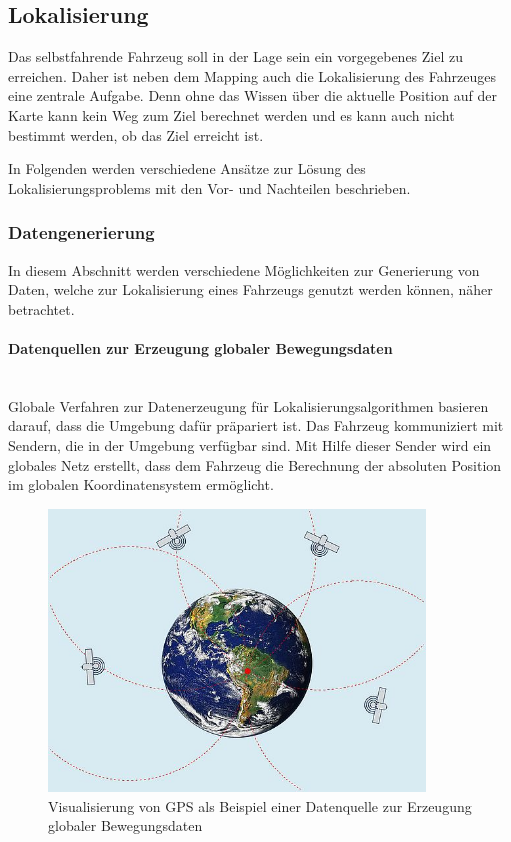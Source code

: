 \subsection{Lokalisierung}
Das selbstfahrende Fahrzeug soll in der Lage sein ein vorgegebenes Ziel zu erreichen. 
Daher ist neben dem Mapping auch die Lokalisierung des Fahrzeuges eine zentrale Aufgabe. 
Denn ohne das Wissen über die aktuelle Position auf der Karte kann kein Weg zum Ziel berechnet werden
und es kann auch nicht bestimmt werden, ob das Ziel erreicht ist.

In Folgenden werden verschiedene Ansätze zur Lösung des Lokalisierungsproblems mit den Vor- und Nachteilen beschrieben.

\subsubsection{Datengenerierung}
In diesem Abschnitt werden verschiedene Möglichkeiten zur Generierung von Daten, welche zur Lokalisierung eines Fahrzeugs genutzt werden können, näher betrachtet.

\paragraph{Datenquellen zur Erzeugung globaler Bewegungsdaten} \mbox{}\\
Globale Verfahren zur Datenerzeugung für Lokalisierungsalgorithmen basieren darauf, dass die Umgebung dafür präpariert ist.
Das Fahrzeug kommuniziert mit Sendern, die in der Umgebung verfügbar sind. 
Mit Hilfe dieser Sender wird ein globales Netz erstellt, dass dem Fahrzeug die Berechnung der absoluten Position im 
globalen Koordinatensystem ermöglicht.

\begin{figure}[H]
    \centering
    \includegraphics[width=10cm]{graphics/gps.jpg}
    \caption{Visualisierung von GPS als Beispiel einer Datenquelle zur Erzeugung globaler Bewegungsdaten }
    \label{fig:gpsPicture}
\end{figure}

